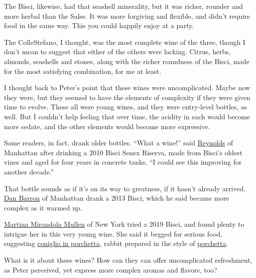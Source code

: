 The Bisci, likewise, had that seashell minerality, but it was richer,
rounder and more herbal than the Salse. It was more forgiving and
flexible, and didn't require food in the same way. This you could
happily enjoy at a party.

The ColleStefano, I thought, was the most complete wine of the three,
though I don't mean to suggest that either of the others were lacking.
Citrus, herbs, almonds, seashells and stones, along with the richer
roundness of the Bisci, made for the most satisfying combination, for me
at least.

I thought back to Peter's point that these wines were uncomplicated.
Maybe now they were, but they seemed to have the elements of complexity
if they were given time to evolve. These all were young wines, and they
were entry-level bottles, as well. But I couldn't help feeling that over
time, the acidity in each would become more sedate, and the other
elements would become more expressive.

Some readers, in fact, drank older bottles. ``What a wine!'' said
\href{https://www.nytimes3xbfgragh.onion/2020/07/02/dining/drinks/wine-school-assignment-verdicchio-di-matelica.html\#commentsContainer\&permid=107985862}{Reynolds}
of Manhattan after drinking a 2010 Bisci Senex Riserva, made from
Bisci's oldest vines and aged for four years in concrete tanks. ``I
could see this improving for another decade.''

That bottle sounds as if it's on its way to greatness, if it hasn't
already arrived.
\href{https://www.nytimes3xbfgragh.onion/2020/07/02/dining/drinks/wine-school-assignment-verdicchio-di-matelica.html\#commentsContainer\&permid=107955758}{Dan
Barron} of Manhattan drank a 2013 Bisci, which he said became more
complex as it warmed up.

\href{https://www.nytimes3xbfgragh.onion/2020/07/02/dining/drinks/wine-school-assignment-verdicchio-di-matelica.html\#commentsContainer\&permid=108292784}{Martina
Mirandola Mullen} of New York tried a 2019 Bisci, and found plenty to
intrigue her in this very young wine. She said it begged for serious
food, suggesting
\href{https://ouritaliantable.com/a-modern-coniglio-in-porchetta/}{coniglio
in porchetta}, rabbit prepared in the style of
\href{https://cooking.nytimes3xbfgragh.onion/recipes/1017068-porchetta-pork-roast?action=click\&module=Collection\%20Page\%20Recipe\%20Card\&region=Project\%20Cooking\&pgType=collection\&rank=33}{porchetta}.

What is it about these wines? How can they can offer uncomplicated
refreshment, as Peter perceived, yet express more complex aromas and
flavors, too?

